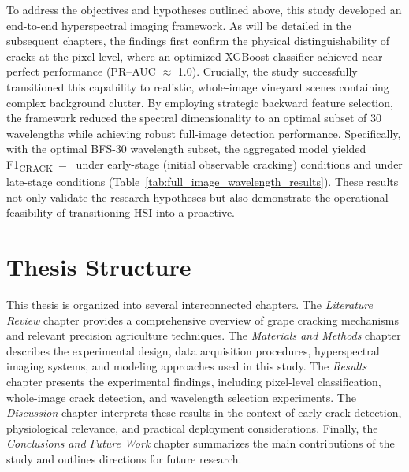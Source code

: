 \noindent
To address the objectives and hypotheses outlined above, this study developed an end-to-end hyperspectral imaging framework. As will be detailed in the subsequent chapters, the findings first confirm the physical distinguishability of cracks at the pixel level, where an optimized XGBoost classifier achieved near-perfect performance (PR--AUC $\approx$ 1.0). Crucially, the study successfully transitioned this capability to realistic, whole-image vineyard scenes containing complex background clutter. By employing strategic backward feature selection, the framework reduced the spectral dimensionality to an optimal subset of 30 wavelengths while achieving robust full-image detection performance. Specifically, with the optimal BFS-30 wavelength subset, the aggregated model yielded F1\textsubscript{CRACK}~=~\FoneEarlyTopThirty{} under early-stage (initial observable cracking) conditions and \FoneLateTopThirty{} under late-stage conditions (Table~\ref{tab:full_image_wavelength_results}). These results not only validate the research hypotheses but also demonstrate the operational feasibility of transitioning HSI into a proactive.

\section{Thesis Structure}

\noindent
This thesis is organized into several interconnected chapters. The \textit{Literature Review} chapter provides a comprehensive overview of grape cracking mechanisms and relevant precision agriculture techniques. The \textit{Materials and Methods} chapter describes the experimental design, data acquisition procedures, hyperspectral imaging systems, and modeling approaches used in this study. The \textit{Results} chapter presents the experimental findings, including pixel-level classification, whole-image crack detection, and wavelength selection experiments. The \textit{Discussion} chapter interprets these results in the context of early crack detection, physiological relevance, and practical deployment considerations. Finally, the \textit{Conclusions and Future Work} chapter summarizes the main contributions of the study and outlines directions for future research.
